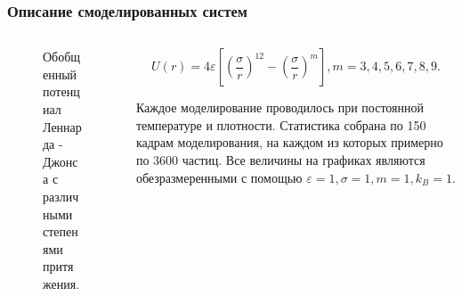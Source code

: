 \documentclass[pdf,hyperref={unicode}]{beamer}
\begin{document}
\begin{frame}
\transdissolve[duration=0.2]
\frametitle{Описание смоделированных систем}

\begin{columns}

\begin{column}{0.5\linewidth}

\begin{figure}[h]

\caption{\tiny Обобщенный потенциал Леннарда - Джонса с различными степенями притяжения.}
\end{figure}

\end{column}

\begin{column}{0.5\linewidth}
\tiny{

\begin{equation}
U(r) = 4\varepsilon \left[ \left(\frac{\sigma}{r}\right)^{12} - \left(\frac{\sigma}{r}\right)^{m} \right], m = 3, 4, 5, 6, 7, 8, 9.
\label{eqLJ}
\end{equation}

Каждое моделирование проводилось при постоянной температуре и плотности. Статистика собрана по 150 кадрам моделирования, на каждом из которых примерно по 3600 частиц. Все величины на графиках являются обезразмеренными с помощью $\varepsilon = 1, \sigma = 1, m = 1, k_B = 1$.

}
\end{column}
\end{columns}
\end{frame}
\end{document}
